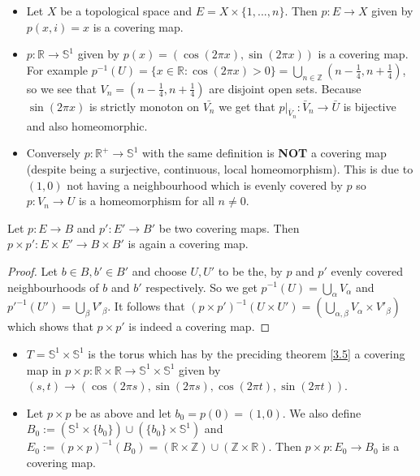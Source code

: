 \begin{example}\label{3.4}
    \leavevmode
    \begin{itemize}
        \item Let $X$ be a topological space and $E=X\times \{1,...,n\}$. Then $p:E\to X$ given by $p(x,i)=x$ is a covering map.
        \item $p:\mathbb{R}\to \mathbb{S}^1$ given by $p(x)=(\cos(2\pi x),\sin(2\pi x))$ is a covering map. For example $p^{-1}(U)=\{x\in \mathbb{R}:\cos (2\pi x)>0\}=\bigcup\limits_{n\in \mathbb{Z}}(n-\frac{1}{4},n+\frac{1}{4})$, so we see that $V_n=(n-\frac{1}{4},n+\frac{1}{4})$ are disjoint open sets. Because $\sin(2\pi x)$ is strictly monoton on $\bar{V_n}$ we get that $p|_{\bar V_n}:\bar V_n\to \bar U$ is bijective and also homeomorphic.
        \item Conversely $p:\mathbb{R}^+\to \mathbb{S}^1$ with the same definition is \textbf{NOT} a covering map (despite being a surjective, continuous, local homeomorphism). This is due to $(1,0)$ not having a neighbourhood which is evenly covered by $p$ so $p:V_n\to U$ is a homeomorphism for all $n\neq 0$.
    \end{itemize}
\end{example}
\begin{theorem}\label{3.5}
    Let $p:E\to B$ and $p':E'\to B'$ be two covering maps. Then $p\times p':E\times E'\to B\times B'$ is again a covering map.
\end{theorem}
\begin{proof}
    Let $b\in B,b'\in B'$ and choose $U,U'$ to be the, by $p$ and $p'$ evenly covered neighbourhoods of $b$ and $b'$ respectively. So we get $p^{-1}(U)=\bigcup\limits_\alpha V_\alpha$ and $p'^{-1}(U')=\bigcup\limits_\beta V'_\beta$. 
    It follows that $(p\times p')^{-1}(U\times U')=(\bigcup\limits_{\alpha,\beta}V_\alpha\times V'_\beta)$ which shows that $p\times p'$ is indeed a covering map. 
\end{proof}
\begin{example}\label{3.6}
    \begin{itemize}
        \item $T=\mathbb{S}^1\times \mathbb{S}^1$ is the torus which has by the preciding theorem \ref{3.5} a covering map in $p\times p:\mathbb{R}\times \mathbb{R}\to \mathbb{S}^1\times \mathbb{S}^1$ given by $(s,t)\to (\cos(2\pi s),\sin(2\pi s),\cos(2\pi t),\sin(2\pi t))$.
        \item Let $p\times p$ be as above and let $b_0=p(0)=(1,0)$. We also define $B_0:=(\mathbb{S}^1\times\{b_0\})\cup(\{b_0\}\times \mathbb{S}^1)$ and $E_0:=(p\times p)^{-1}(B_0)=(\mathbb{R}\times\mathbb{Z})\cup(\mathbb{Z}\times \mathbb{R})$. Then $p\times p:E_0\to B_0$ is a covering map.
    \end{itemize}
\end{example}
